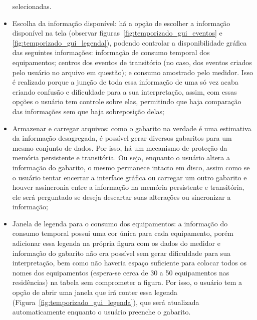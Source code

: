 \begin{itemize}
selecionadas.
\item Escolha da informação disponível: há a opção de escolher a
informação disponível na tela (observar
figuras~\ref{fig:temporizado_gui_eventos} e
\ref{fig:temporizado_gui_legenda}),
podendo controlar a disponibilidade gráfica das seguintes informações:
informação de consumo temporal dos equipamentos; centros dos eventos de
transitório (no caso, dos eventos criados pelo usuário no arquivo em
questão); e consumo amostrado pelo medidor. Isso é realizado porque a
junção de toda essa informação de uma só vez acaba criando confusão e
dificuldade para a sua interpretação, assim, com essas opções o
usuário tem controle sobre elas, permitindo que haja comparação das
informações sem que haja sobreposição delas;
\item Armazenar e carregar arquivos: como o gabarito na verdade é uma
estimativa da informação desagregada, é possível gerar diversos
gabaritos para um mesmo conjunto de dados. Por isso, há um mecanismo de
proteção da memória persistente e transitória. Ou seja, enquanto o
usuário altera a informação do gabarito, o mesmo permanece intacto em
disco, assim como se o usuário tentar encerrar a interface gráfica ou
carregar um outro gabarito e houver assincronia entre a informação
na memória persistente e transitória, ele será perguntado se deseja
descartar suas alterações ou sincronizar a informação;
\item Janela de legenda para o consumo dos equipamentos: a informação do
consumo temporal possui uma cor única para cada equipamento, porém
adicionar essa legenda na própria figura com os dados do medidor e
informação do gabarito não era possível sem gerar dificuldade para sua
interpretação, bem como não haveria espaço suficiente para colocar
todos os nomes dos equipamentos (espera-se cerca de 30 a 50 equipamentos nas
residências) na tabela sem comprometer a figura. Por isso, o usuário
tem a opção de abrir uma janela que irá conter essa legenda
(Figura~\ref{fig:temporizado_gui_legenda}), que será atualizada
automaticamente enquanto o usuário preenche o gabarito.
\end{itemize}

